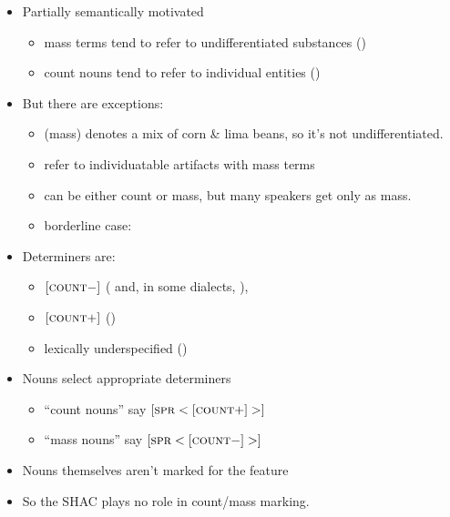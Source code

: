 \documentclass[a4paper,landscape,headrule,footrule,dvips]{foils}
\begin{document}
\begin{itemize}
\item Partially semantically motivated
\begin{itemize}
  \item mass terms tend to refer to undifferentiated substances ()
\item count nouns tend to refer to individual entities ()
\end{itemize}
\item But there are exceptions:
  \begin{itemize}
  \item {} (mass) denotes a mix of corn \& lima beans, so
it’s not undifferentiated.
  \item {} refer to individuatable
artifacts with mass terms
  \item {} can be either count or mass, but many speakers
get  only as mass.
  \item borderline case: 
  \end{itemize}
\end{itemize}


\begin{itemize}
\item Determiners are:
\begin{itemize}
  \item $[\textsc{count} -]$ ( and, in some dialects, ),
  \item $[\textsc{count} +]$ ()
  \item lexically underspecified ()
  \end{itemize}
\item Nouns select appropriate determiners
  \begin{itemize}
  \item “count nouns” say $[\textsc{spr} < [\textsc{count} +] >]$
  \item “mass nouns” say $[\textsc{spr} < [\textsc{count} -] >]$
  \end{itemize}
\item Nouns themselves aren’t marked for the feature 
\item So the SHAC plays no role in count/mass marking.
\end{itemize}
\end{document}
